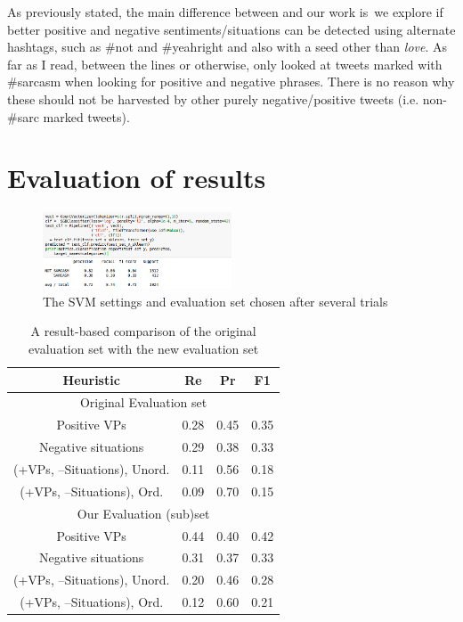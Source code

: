 \documentclass[11pt]{article}
\begin{document}
As previously stated, the main difference between \cite{riloff2013sarcasm} and our work is we explore  if better positive and negative sentiments/situations can be detected using alternate hashtags, such as \#not and \#yeahright and also with a seed other than \textit{love}. As far as I read, between the lines or otherwise, \cite{riloff2013sarcasm} only looked at tweets marked with \#sarcasm when looking for positive and negative phrases. There is no reason why these should not be harvested by other purely negative/positive tweets (i.e. non-\#sarc marked tweets).

\section{Evaluation of results}

\begin{figure}
\includegraphics[width=0.5\textwidth]{the-chosen-svm-settings}
\caption{The SVM settings and evaluation set chosen after several trials}
\label{fig:results-choosing-svm-and-data}
\end{figure}

\begin{table}
\centering
\begin{tabular}{ | c | c c c |} 
\hline
Heuristic & Re & Pr & F1 \\
 \hline
 \multicolumn{4}{|c|}{Original Evaluation set} \\
 \hline
 Positive VPs & 0.28 & 0.45 & 0.35 \\ 
 Negative situations & 0.29 & 0.38 & 0.33 \\ 
 (+VPs, –Situations), Unord. & 0.11 & 0.56 & 0.18 \\ 
 (+VPs, –Situations), Ord. & 0.09 & 0.70 & 0.15 \\ 
 \hline
  \multicolumn{4}{|c|}{Our Evaluation (sub)set} \\
  \hline
 Positive VPs & 0.44 & 0.40 & 0.42 \\ 
 Negative situations & 0.31 & 0.37 & 0.33 \\ 
 (+VPs, –Situations), Unord. & 0.20 & 0.46 & 0.28 \\ 
 (+VPs, –Situations), Ord. & 0.12 & 0.60 & 0.21 \\ 
 \hline
\end{tabular}
\caption{A result-based comparison of the original evaluation set with the new evaluation set}
\label{table:1}
\end{table}
\end{document}
